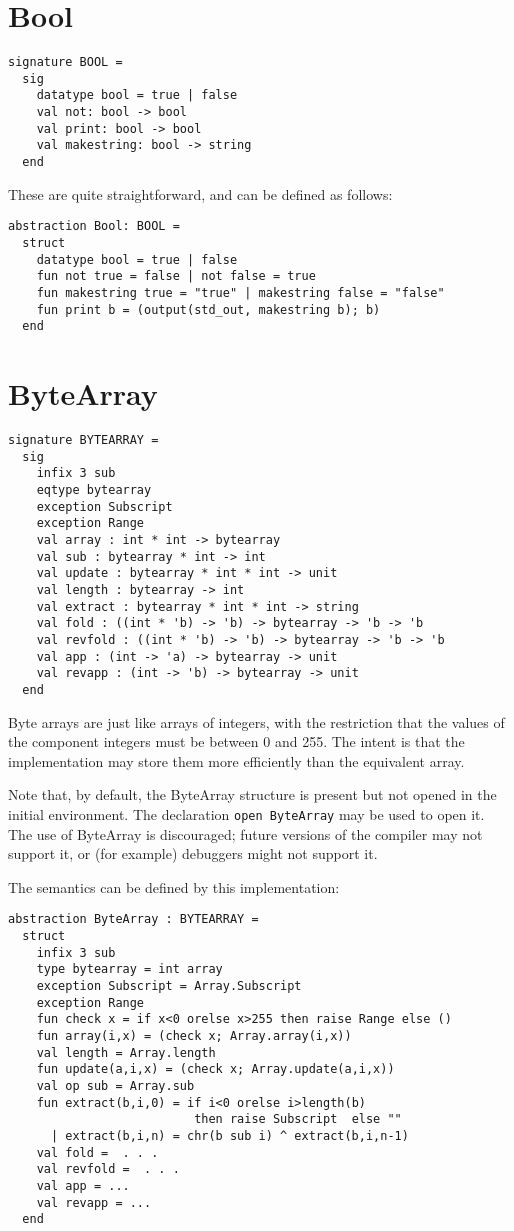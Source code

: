 \section{Bool}
\begin{verbatim}
signature BOOL =
  sig
    datatype bool = true | false
    val not: bool -> bool
    val print: bool -> bool
    val makestring: bool -> string
  end
\end{verbatim}
These are quite straightforward, and can be defined as follows:
\begin{verbatim}
abstraction Bool: BOOL =
  struct
    datatype bool = true | false
    fun not true = false | not false = true
    fun makestring true = "true" | makestring false = "false"
    fun print b = (output(std_out, makestring b); b)
  end
\end{verbatim}
\section{ByteArray}
\begin{verbatim}
signature BYTEARRAY =
  sig
    infix 3 sub
    eqtype bytearray
    exception Subscript
    exception Range
    val array : int * int -> bytearray
    val sub : bytearray * int -> int
    val update : bytearray * int * int -> unit
    val length : bytearray -> int
    val extract : bytearray * int * int -> string
    val fold : ((int * 'b) -> 'b) -> bytearray -> 'b -> 'b
    val revfold : ((int * 'b) -> 'b) -> bytearray -> 'b -> 'b
    val app : (int -> 'a) -> bytearray -> unit
    val revapp : (int -> 'b) -> bytearray -> unit
  end
\end{verbatim}
Byte arrays are just like arrays of integers, with the restriction
that the values of the component integers must be between 0 and 255.
The intent is that the implementation may store them more efficiently
than the equivalent array.

Note that, by default, the ByteArray structure is present but 
not opened in the 
initial environment.  The declaration \verb"open ByteArray" may be
used to open it.  The use of ByteArray is discouraged; future versions of the
compiler may not support it, or (for example) debuggers might
not support it.

The semantics can be defined by this implementation:
\begin{verbatim}
abstraction ByteArray : BYTEARRAY =
  struct
    infix 3 sub
    type bytearray = int array
    exception Subscript = Array.Subscript
    exception Range
    fun check x = if x<0 orelse x>255 then raise Range else ()
    fun array(i,x) = (check x; Array.array(i,x))
    val length = Array.length
    fun update(a,i,x) = (check x; Array.update(a,i,x))
    val op sub = Array.sub
    fun extract(b,i,0) = if i<0 orelse i>length(b)
                          then raise Subscript  else ""
      | extract(b,i,n) = chr(b sub i) ^ extract(b,i,n-1)
    val fold =  . . .
    val revfold =  . . .
    val app = ...
    val revapp = ...
  end
\end{verbatim}


